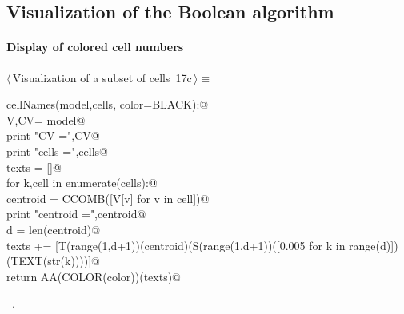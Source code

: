 \documentclass[11pt,oneside]{article}	%
\begin{document}
\subsection{Visualization of the Boolean algorithm}

\paragraph{Display of colored cell numbers}

\begin{flushleft} \small \label{scrap39}
\protect{}$\langle\,$Visualization of a subset of cells\nobreak\ {\footnotesize 17c}$\,\rangle\equiv$
\vspace{-1ex}
\begin{list}{}{} \item
\mbox{}\verb@def cellNames(model,cells, color=BLACK):@\\
\mbox{}\verb@   V,CV= model@\\
\mbox{}\verb@   print "\n CV =",CV@\\
\mbox{}\verb@   print "\n cells =",cells@\\
\mbox{}\verb@   texts = []@\\
\mbox{}\verb@   for k,cell in enumerate(cells):@\\
\mbox{}\verb@      centroid = CCOMB([V[v] for v in cell])@\\
\mbox{}\verb@      print "centroid =",centroid@\\
\mbox{}\verb@      d = len(centroid)@\\
\mbox{}\verb@      texts += [T(range(1,d+1))(centroid)(S(range(1,d+1))([0.005 for k in range(d)])(TEXT(str(k))))]@\\
\mbox{}\verb@   return AA(COLOR(color))(texts)@\\
\mbox{}\verb@@{\NWsep}
\end{list}
\vspace{-1ex}
\footnotesize\addtolength{\baselineskip}{-1ex}
\begin{list}{}{\setlength{\itemsep}{-\parsep}\setlength{\itemindent}{-\leftmargin}}
\item \NWtxtMacroRefIn\ .
\end{list}
\end{flushleft}
\end{document}
